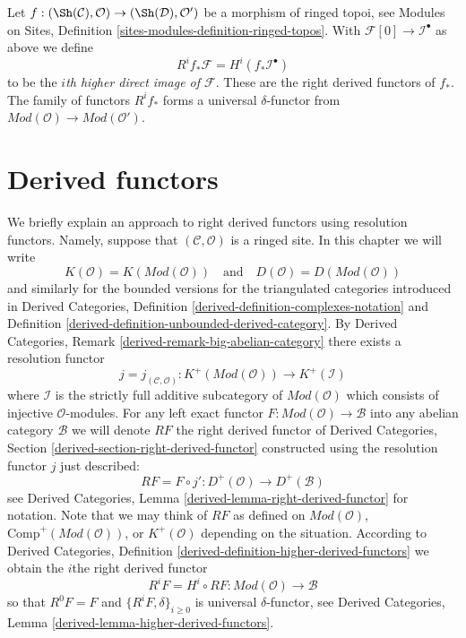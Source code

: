 \medskip\noindent
Let $f : (\Sh(\mathcal{C}), \mathcal{O}) \to (\Sh(\mathcal{D}), \mathcal{O}')$
be a morphism of ringed topoi, see
Modules on Sites, Definition \ref{sites-modules-definition-ringed-topos}.
With $\mathcal{F}[0] \to \mathcal{I}^\bullet$ as above
we define
\begin{equation}
\label{equation-higher-direct-image-modules}
R^if_*\mathcal{F} = H^i(f_*\mathcal{I}^\bullet)
\end{equation}
to be the {\it $i$th higher direct image of $\mathcal{F}$}.
These are the right derived functors of $f_*$.
The family of functors $R^if_*$ forms a universal $\delta$-functor
from $\textit{Mod}(\mathcal{O}) \to \textit{Mod}(\mathcal{O}')$.








\section{Derived functors}
\label{section-derived-functors}

\noindent
We briefly explain an approach to right derived functors using resolution
functors. Namely, suppose that $(\mathcal{C}, \mathcal{O})$ is a ringed site.
In this chapter we will write
$$
K(\mathcal{O}) = K(\textit{Mod}(\mathcal{O}))
\quad
\text{and}
\quad
D(\mathcal{O}) = D(\textit{Mod}(\mathcal{O}))
$$
and similarly for the bounded versions for the triangulated categories
introduced in
Derived Categories, Definition \ref{derived-definition-complexes-notation} and
Definition \ref{derived-definition-unbounded-derived-category}.
By
Derived Categories, Remark \ref{derived-remark-big-abelian-category}
there exists a resolution functor
$$
j = j_{(\mathcal{C}, \mathcal{O})} :
K^{+}(\textit{Mod}(\mathcal{O}))
\longrightarrow
K^{+}(\mathcal{I})
$$
where $\mathcal{I}$ is the strictly full additive subcategory of
$\textit{Mod}(\mathcal{O})$ which consists of injective $\mathcal{O}$-modules.
For any left exact functor $F : \textit{Mod}(\mathcal{O}) \to \mathcal{B}$
into any abelian category $\mathcal{B}$ we will denote $RF$ the
right derived functor of
Derived Categories, Section \ref{derived-section-right-derived-functor}
constructed using the resolution functor $j$ just described:
\begin{equation}
\label{equation-RF}
RF = F \circ j' : D^{+}(\mathcal{O}) \longrightarrow D^{+}(\mathcal{B})
\end{equation}
see
Derived Categories, Lemma \ref{derived-lemma-right-derived-functor}
for notation. Note that we may think of $RF$ as defined on
$\textit{Mod}(\mathcal{O})$, $\text{Comp}^{+}(\textit{Mod}(\mathcal{O}))$, or
$K^{+}(\mathcal{O})$ depending on the situation. According to
Derived Categories, Definition \ref{derived-definition-higher-derived-functors}
we obtain the $i$the right derived functor
\begin{equation}
\label{equation-RFi}
R^iF = H^i \circ RF : \textit{Mod}(\mathcal{O}) \longrightarrow \mathcal{B}
\end{equation}
so that $R^0F = F$ and $\{R^iF, \delta\}_{i \geq 0}$ is universal
$\delta$-functor, see
Derived Categories, Lemma \ref{derived-lemma-higher-derived-functors}.

